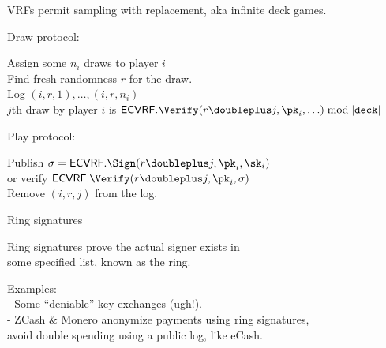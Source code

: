 \documentclass{beamer}
\begin{document}
\begin{frame}

VRFs permit sampling with replacement, aka infinite deck games.

\bigskip\bigskip

Draw protocol: \\ \medskip

Assign some $n_i$ draws to player $i$ \\
Find fresh randomness $r$ for the draw. \\
Log $(i,r,1),\ldots,(i,r,n_i)$ \\ %
$j$th draw by player $i$ is $\mathsf{ECVRF}.\Verify(r \doubleplus j,\pk_i,\ldots) \bmod |\mathtt{deck}|$ \\

\bigskip\bigskip

Play protocol: \\ \medskip

Publish $\sigma = \mathsf{ECVRF}.\Sign(r \doubleplus j,\pk_i,\sk_i)$ \\
or verify $\mathsf{ECVRF}.\Verify(r \doubleplus j,\pk_i,\sigma)$ \\
Remove $(i,r,j)$ from the log.

\end{frame}



\begin{frame}{Ring signatures}

Ring signatures prove the actual signer exists in \\
\hspace{10pt} some specified list, known as the ring.

\bigskip\bigskip

Examples: \\
- Some ``deniable'' key exchanges (ugh!). \\
- ZCash \& Monero anonymize payments using ring signatures, \\
\hspace{10pt} avoid double spending using a public log, like eCash.

\end{frame}
\end{document}

